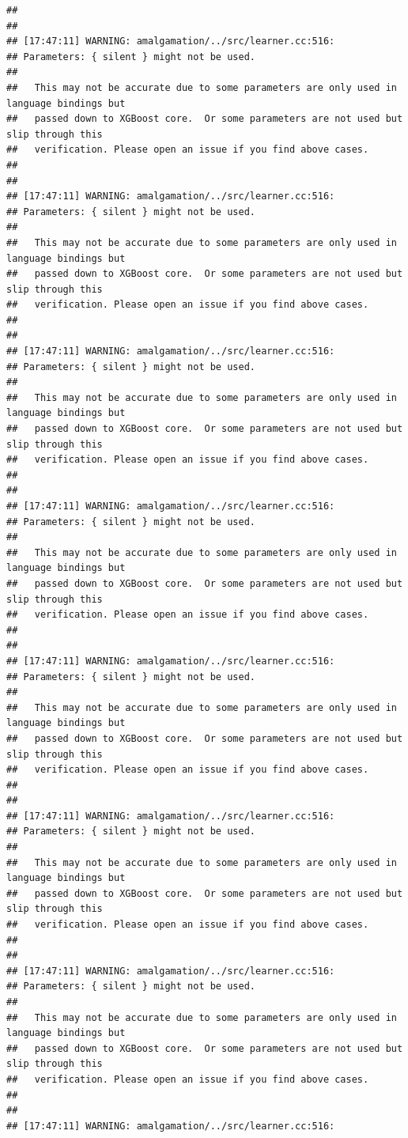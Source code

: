 \documentclass[AMS,STIX2COL]{WileyNJD-v2}\usepackage[]{graphicx}\usepackage[]{color}
\makeatletter
\newenvironment{kframe}{%
 \def\at@end@of@kframe{}%
 \ifinner\ifhmode%
  \def\at@end@of@kframe{\end{minipage}}%
  \begin{minipage}{\columnwidth}%
 \fi\fi%
 \def\FrameCommand##1{\hskip\@totalleftmargin \hskip-\fboxsep
 \colorbox{shadecolor}{##1}\hskip-\fboxsep
     \hskip-\linewidth \hskip-\@totalleftmargin \hskip\columnwidth}%
 \MakeFramed {\advance\hsize-\width
   \@totalleftmargin\z@ \linewidth\hsize
   \@setminipage}}%
 {\par\unskip\endMakeFramed%
 \at@end@of@kframe}
\newenvironment{knitrout}{}{} %
\makeatother
\begin{document}
\begin{knitrout}
\begin{kframe}
\begin{verbatim}
## 
## 
## [17:47:11] WARNING: amalgamation/../src/learner.cc:516: 
## Parameters: { silent } might not be used.
## 
##   This may not be accurate due to some parameters are only used in language bindings but
##   passed down to XGBoost core.  Or some parameters are not used but slip through this
##   verification. Please open an issue if you find above cases.
## 
## 
## [17:47:11] WARNING: amalgamation/../src/learner.cc:516: 
## Parameters: { silent } might not be used.
## 
##   This may not be accurate due to some parameters are only used in language bindings but
##   passed down to XGBoost core.  Or some parameters are not used but slip through this
##   verification. Please open an issue if you find above cases.
## 
## 
## [17:47:11] WARNING: amalgamation/../src/learner.cc:516: 
## Parameters: { silent } might not be used.
## 
##   This may not be accurate due to some parameters are only used in language bindings but
##   passed down to XGBoost core.  Or some parameters are not used but slip through this
##   verification. Please open an issue if you find above cases.
## 
## 
## [17:47:11] WARNING: amalgamation/../src/learner.cc:516: 
## Parameters: { silent } might not be used.
## 
##   This may not be accurate due to some parameters are only used in language bindings but
##   passed down to XGBoost core.  Or some parameters are not used but slip through this
##   verification. Please open an issue if you find above cases.
## 
## 
## [17:47:11] WARNING: amalgamation/../src/learner.cc:516: 
## Parameters: { silent } might not be used.
## 
##   This may not be accurate due to some parameters are only used in language bindings but
##   passed down to XGBoost core.  Or some parameters are not used but slip through this
##   verification. Please open an issue if you find above cases.
## 
## 
## [17:47:11] WARNING: amalgamation/../src/learner.cc:516: 
## Parameters: { silent } might not be used.
## 
##   This may not be accurate due to some parameters are only used in language bindings but
##   passed down to XGBoost core.  Or some parameters are not used but slip through this
##   verification. Please open an issue if you find above cases.
## 
## 
## [17:47:11] WARNING: amalgamation/../src/learner.cc:516: 
## Parameters: { silent } might not be used.
## 
##   This may not be accurate due to some parameters are only used in language bindings but
##   passed down to XGBoost core.  Or some parameters are not used but slip through this
##   verification. Please open an issue if you find above cases.
## 
## 
## [17:47:11] WARNING: amalgamation/../src/learner.cc:516: 

\end{verbatim}
\end{kframe}
\end{knitrout}
\end{document}
